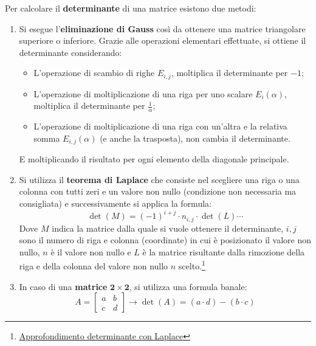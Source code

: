 \documentclass[a4paper]{article}
\begin{document}
	Per calcolare il \textbf{determinante} di una matrice esistono due metodi:
	\begin{enumerate}
		\item Si esegue l'\textbf{eliminazione di Gauss} così da ottenere una matrice triangolare superiore o inferiore. Grazie alle operazioni elementari effettuate, si ottiene il determinante considerando:
		\begin{itemize}
			\item L'operazione di scambio di righe $E_{i,j}$, moltiplica il determinante per $-1$;
			\item L'operazione di moltiplicazione di una riga per uno scalare $E_{i}\left(\alpha\right)$, moltiplica il determinante per $\frac{1}{\alpha}$;
			\item L'operazione di moltiplicazione di una riga con un'altra e la relativa somma $E_{i,j}\left(\alpha\right)$ (e anche la trasposta), non cambia il determinante.
		\end{itemize}
		E moltiplicando il risultato per ogni elemento della diagonale principale.
		
		\item Si utilizza il \textbf{teorema di Laplace} che consiste nel scegliere una riga o una colonna con tutti zeri e un valore non nullo (condizione non necessaria ma consigliata) e successivamente si applica la formula:
		\begin{equation*}
			\det\left(M\right) = \left(-1\right)^{i+j} \cdot n_{i,j} \cdot \det\left(L\right) \cdots
		\end{equation*}
		Dove $M$ indica la matrice dalla quale si vuole ottenere il determinante, $i,j$ sono il numero di riga e colonna (coordinate) in cui è posizionato il valore non nullo, $n$ è il valore non nullo e $L$ è la matrice risultante dalla rimozione della riga e della colonna del valore non nullo $n$ scelto.\footnote{\href{https://www.youmath.it/forum/algebra-lineare/27516-calcolo-del-determinante-di-una-matrice-con-laplace.html}{Approfondimento determinante con Laplace}}
		
		\item In caso di una \textbf{matrice} $\boldsymbol{2 \times 2}$, si utilizza una formula banale:
		\begin{equation*}
			A = \begin{bmatrix}
				a & b \\
				c & d
			\end{bmatrix} \longrightarrow \det\left(A\right) = \left(a \cdot d\right) - \left(b \cdot c\right)
		\end{equation*}
	\end{enumerate}\newpage
\end{document}
